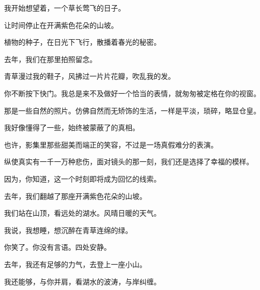 \documentclass[12pt,a4paper]{article}
\def\blankrev{\vspace{1ex}}									%
\begin{document}
		\blankrev
		我开始想望着，一个草长莺飞的日子。\par
		让时间停止在开满紫色花朵的山坡。\par
		植物的种子，在日光下飞行，散播着春光的秘密。\par
		去年，我们在那里拍照留念。\par
		青草漫过我的鞋子，风拂过一片片花瓣，吹乱我的发。\par
		你不断按下快门。我总是来不及做好一个恰当的表情，就匆匆被定格在你的视窗。\par
		那是一些自然的照片。仿佛自然而无矫饰的生活，一样是平淡，琐碎，略显仓皇。\par
		我好像懂得了一些，始终被蒙蔽了的真相。\par
		也许，影集里那些甜美而端正的笑容，不过是一场真假难分的表演。\par
		纵使真实有一千一万种悲伤，面对镜头的那一刻，我们还是选择了幸福的模样。\par
		因为，你知道，这一个时刻即将成为回忆的线索。\par
		去年，我们翻越了那座开满紫色花朵的山坡。\par
		我们站在山顶，看远处的湖水。风晴日暖的天气。\par
		我说，我想睡，想沉醉在青草连绵的绿。\par
		你笑了。你没有言语。四处安静。

		\blankrev
		去年，我还有足够的力气，去登上一座小山。\par
		我还能够，与你并肩，看湖水的波涛，与岸纠缠。
\end{document}
